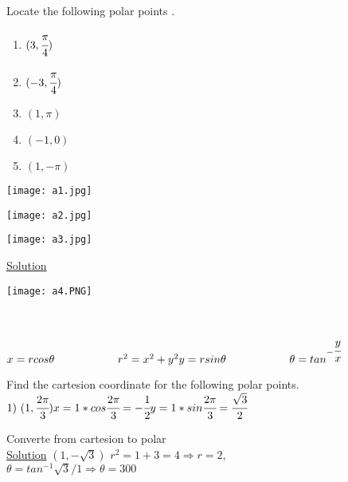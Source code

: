 \begin{example}
Locate the following polar points .
\begin{enumerate}
    \item $(3,\cfrac{\pi}{4}) $
    \item $(-3,\cfrac{\pi}{4})$
    \item $(1,\pi)$
    \item $(-1,0)$
    \item $(1,-\pi)$
\end{enumerate}
\begin{minipage}{0.3\textwidth}
\texttt{[image: a1.jpg]}
\end{minipage}
\begin{minipage}{.3\textwidth}
\texttt{[image: a2.jpg]}
\end{minipage}
\hfill
\begin{minipage}{.3\textwidth}
\texttt{[image: a3.jpg]}
\end{minipage}
\begin{minipage}{0.5\textwidth}
\underline{\textbf{\large}\color{smalt(darkpowderblue)}Solution} \\
\end{minipage}
\begin{minipage}{.5\textwidth}
\texttt{[image: a4.PNG]}
\end{minipage} \\
\end{example}
\noindent{\color{smalt(darkpowderblue)}\rule{\linewidth}{.2mm}}
$x=rcos\theta \hspace{2cm} r^2=x^2+y^2\\y=rsin\theta \hspace{2cm} \theta=tan^{-\cfrac{y}{x}}$ \\
\begin{example}
Find the cartesion coordinate for the following polar points.
$1) ~(1, \cfrac{2\pi}{3}) \hspace{2cm} \\x=1*cos\cfrac{2\pi}{3}=-\cfrac{1}{2} \\y=1*sin\cfrac{2\pi}{3}=\cfrac{\sqrt{3}}{2}$\\
\end{example}
\noindent{\color{smalt(darkpowderblue)}\rule{\linewidth}{.2mm}}
\begin{example}
Converte from cartesion to polar \\
\underline{\textbf{\large}\color{smalt(darkpowderblue)}Solution}
$(1,-\sqrt{3}) $
$r^2=1+3 =4 \Rightarrow r=2$,\\ \vspace{.5cm} $\theta=tan^{-1}\sqrt{3}/1 \Rightarrow \theta=300$\\
\end{example}
